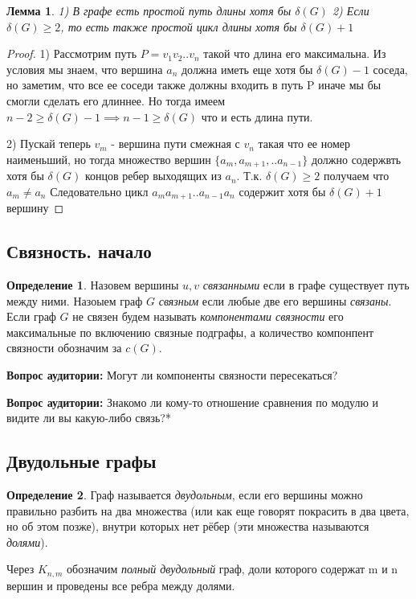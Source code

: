 \documentclass{article}
\renewcommand{\ge}{\geqslant}
\newtheorem{lemma}{Лемма}
\theoremstyle{definition}
\newtheorem{definition}{Определение}[section]
\newcommand{\question}{\textbf{Вопрос аудитории: }}
\theoremstyle{remark}
\begin{document}
\begin{lemma} 
    1) В графе есть простой путь длины хотя бы $\delta(G)$
    2) Если $\delta(G) \ge 2$, то есть также простой цикл длины хотя бы $\delta(G) + 1$ \label{lemma3}
\end{lemma}
\begin{proof}
    1) Рассмотрим путь $P = v_1v_2..v_n$ такой что длина его максимальна. Из условия мы знаем, что вершина $a_n$ должна иметь еще хотя бы $\delta(G) - 1$ соседа, но заметим, что все ее соседи также должны входить в путь P иначе мы бы смогли сделать его длиннее. Но тогда имеем $n - 2 \ge \delta(G) - 1 \implies n - 1 \ge \delta(G)$ что и есть длина пути. 

    2) Пускай теперь $v_m$ - вершина пути смежная с $v_n$ такая что ее номер наименьший, но тогда множество вершин $\{a_m, a_{m+1}, .. a_{n-1} \}$ должно содержвть хотя бы $\delta(G)$ концов ребер выходящих из $a_n$. Т.к. $\delta(G) \ge 2$ получаем что $a_m \not= a_n$ Следовательно цикл $a_ma_{m+1}..a_{n-1}a_n$ содержит хотя бы $\delta(G) + 1$ вершину
\end{proof}


\subsection{Связность. начало}

\begin{definition}
    Назовем вершины $u, v$ \textit{связанными} если в графе существует путь между ними. Назоыем граф $G$ \textit{связным} если любые две его вершины \textit{связаны}. Если граф $G$ не связен будем называть \textit{компонентами связности} его максимальные по включению связные подграфы, а количество компонпент связности обозначим за $c(G)$.
\end{definition}

\question Могут ли компоненты связности пересекаться?

\question Знакомо ли кому-то отношение сравнения по модулю и видите ли вы какую-либо связь?*

\subsection{Двудольные графы}

\begin{definition}
    Граф называется \textit{двудольным}, если его вершины можно правильно разбить на два множества (или как еще говорят покрасить в два цвета, но об этом позже), внутри которых нет рёбер (эти множества называются \textit{долями}). 

    Через $K_{n,m}$ обозначим \textit{полный двудольный} граф, доли которого содержат m и n вершин и проведены все ребра между долями.
\end{definition}
\end{document}
